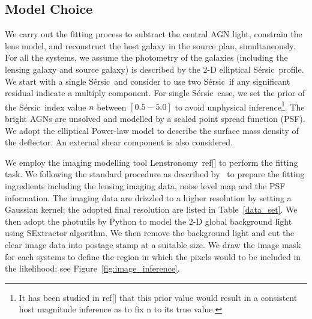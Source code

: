\documentclass[fleqn,usenatbib]{mnras}
\newcommand{\sersic}{S\'ersic}
\newcommand{\lenstronomy}{{\sc Lenstronomy}}
\begin{document}
\subsection{Model Choice}
We carry out the fitting process to subtract the central AGN light, constrain the lens model, and reconstruct the host galaxy in the source plan, simultaneously.
For all the systems, we assume the photometry of the galaxies (including the lensing galaxy and source galaxy) is described by the 2-D elliptical \sersic\ profile. We start with a single \sersic\ and consider to use two \sersic\ if any significant residual indicate a multiply component. For single \sersic\ case, we set the prior of the \sersic\ index value $n$ between $[0.5-5.0]$ to avoid unphysical inference\footnote{It has been studied in ref[] that this prior value would result in a consistent host magnitude inference as to fix n to its true value.}. The bright AGNs are unsolved and modelled by a scaled point spread function (PSF). We adopt the elliptical Power-law model to describe the surface mass density of the deflector. An external shear component is also considered.

We employ the imaging modelling tool \lenstronomy~ref[] to perform the fitting task. We following the standard procedure as described by~\citet{Ding2020} to prepare the fitting ingredients including the lensing imaging data, noise level map and the PSF information. The imaging data are drizzled to a higher resolution by setting a Gaussian kernel; the adopted final resolution are listed in Table~\ref{data_set}. We then adopt the {\sc photutils} by Python to model the 2-D global background light using SExtractor algorithm. We then remove the background light and cut the clear image data into postage stamp at a suitable size. We draw the image mask for each systems to define the region in which the pixels would to be included in the likelihood; see Figure~\ref{fig:image_inference}.
\end{document}
